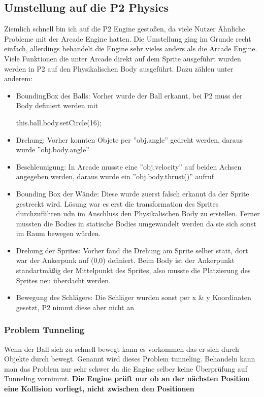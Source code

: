 \subsection{Umstellung auf die P2 Physics}
Ziemlich schnell bin ich auf die P2 Engine gestoßen, da viele Nutzer Ähnliche Probleme mit der Arcade Engine hatten.
\newline
Die Umstellung ging im Grunde recht einfach, allerdings behandelt die Engine sehr vieles anders als die Arcade Engine.
\newline
Viele Funktionen die unter Arcade direkt auf dem Sprite ausgeführt wurden werden in P2 auf den Physikalischen Body ausgeführt. Dazu zählen unter anderem:
\begin{itemize}
	\item
	      BoundingBox des Balls: Vorher wurde der Ball erkannt, bei P2 muss der Body definiert werden mit 
	      \begin{listing}
	      	this.ball.body.setCircle(16);
	      \end{listing}
	\item
	      Drehung: Vorher konnten Objete per ''obj.angle'' gedreht werden, daraus wurde ''obj.body.angle''
	\item
	      Beschleunigung: In Arcade musste eine ''obj.velocity'' auf beiden Achsen angegeben werden, daraus wurde ein ''obj.body.thrust()'' aufruf
	\item
	      Bounding Box der Wände: Diese wurde zuerst falsch erkannt da der Sprite gestreckt wird.
	      Lösung war es erst die transformation des Sprites durchzuführen udn im Anschluss den Physikalischen Body zu erstellen.
	      Ferner mussten die Bodies in statische Bodies umgewandelt werden da sie sich sonst im Raum bewegen würden.
	\item
	      Drehung der Sprites: Vorher fand die Drehung am Sprite selber statt, dort war der Ankerpunk auf (0,0) definiert. Beim Body ist der Ankerpunkt standartmäßig der Mittelpunkt des Sprites, also musste die Platzierung des Sprites neu überdacht werden.
	\item
	      Bewegung des Schlägers: Die Schläger wurden sonst per x \& y Koordinaten gesetzt, P2 nimmt diese aber nicht an
\end{itemize}
\subsubsection{Problem Tunneling}
Wenn der Ball sich zu schnell bewegt kann es vorkommen das er sich durch Objekte durch bewegt. Genannt wird dieses Problem tunneling.
Behandeln kann man das Problem nur sehr schwer da die Engine selber keine Überprüfung auf Tunneling vornimmt.
\newline
\textbf{Die Engine prüft nur ob an der nächsten Position eine Kollision vorliegt, nicht zwischen den Positionen}
